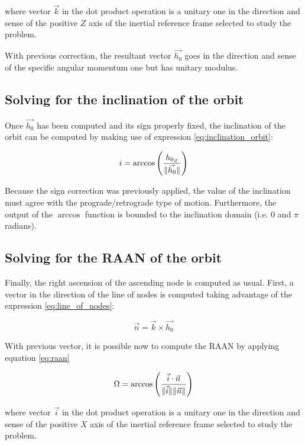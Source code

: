 where vector $\vec{k}$ in the dot product operation is a unitary one in the
direction and sense of the positive $Z$ axis of the inertial reference frame
selected to study the problem.

With previous correction, the resultant vector $\vec{h_{0}}$ goes in the
direction and sense of the specific angular momentum one but has unitary
modulus.

\subsection{Solving for the inclination of the orbit}

Once $\vec{h_{0}}$ has been computed and its sign properly fixed, the
inclination of the orbit can be computed by making use of expression
\ref{eq:inclination_orbit}:

\begin{equation}
  i = \arccos{\left(\frac{h_{0_{Z}}}{\lVert\vec{h_{0}}\rVert} \right)}
  \label{eq:inclination_orbit}
\end{equation}

Because the sign correction was previously applied, the value of the inclination
must agree with the prograde/retrograde type of motion. Furthermore, the output
of the $\arccos$ function is bounded to the inclination domain (i.e. $0$ and
$\pi$ radians).


\subsection{Solving for the RAAN of the orbit}

Finally, the right ascension of the ascending node is computed as usual. First,
a vector in the direction of the line of nodes is computed taking advantage of
the expression \ref{eq:line_of_nodes}:

\begin{equation}
  \vec{n} = \vec{k} \times \vec{h_{0}}
  \label{eq:line_of_nodes}
\end{equation}

With previous vector, it is possible now to compute the RAAN by applying
equation \ref{eq:raan}

\begin{equation}
  \Omega = \arccos{\left(\frac{\vec{i} \cdot \vec{n}}{\lVert\vec{i}\rVert
      \lVert\vec{n}\rVert}\right)}
  \label{eq:raan}
\end{equation}

where vector $\vec{i}$ in the dot product operation is a unitary one in the
direction and sense of the positive $X$ axis of the inertial reference frame
selected to study the problem.

